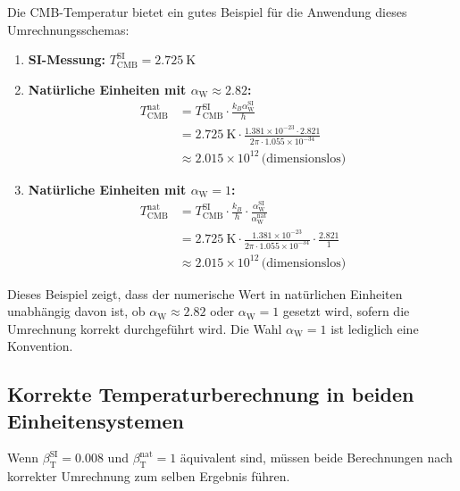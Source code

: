 \documentclass[12pt,a4paper]{article}
\newcommand{\betaT}{\beta_{\text{T}}}
\newcommand{\alphaW}{\alpha_{\text{W}}}
\begin{document}
	Die CMB-Temperatur bietet ein gutes Beispiel für die Anwendung dieses Umrechnungsschemas:
	
	\begin{enumerate}
		\item \textbf{SI-Messung:} \(T_{\text{CMB}}^{\text{SI}} = \SI{2.725}{\kelvin}\)
		\item \textbf{Natürliche Einheiten mit \(\alphaW \approx 2.82\):}
		\begin{align}
			T_{\text{CMB}}^{\text{nat}} &= T_{\text{CMB}}^{\text{SI}} \cdot \frac{k_B \alphaW^{\text{SI}}}{h} \\
			&= \SI{2.725}{\kelvin} \cdot \frac{1.381 \times 10^{-23} \cdot 2.821}{2\pi \cdot 1.055 \times 10^{-34}} \\
			&\approx 2.015 \times 10^{12} \, \text{(dimensionslos)}
		\end{align}
		\item \textbf{Natürliche Einheiten mit \(\alphaW = 1\):}
		\begin{align}
			T_{\text{CMB}}^{\text{nat}} &= T_{\text{CMB}}^{\text{SI}} \cdot \frac{k_B}{h} \cdot \frac{\alphaW^{\text{SI}}}{\alphaW^{\text{nat}}} \\
			&= \SI{2.725}{\kelvin} \cdot \frac{1.381 \times 10^{-23}}{2\pi \cdot 1.055 \times 10^{-34}} \cdot \frac{2.821}{1} \\
			&\approx 2.015 \times 10^{12} \, \text{(dimensionslos)}
		\end{align}
	\end{enumerate}
	
	Dieses Beispiel zeigt, dass der numerische Wert in natürlichen Einheiten unabhängig davon ist, ob \(\alphaW \approx 2.82\) oder \(\alphaW = 1\) gesetzt wird, sofern die Umrechnung korrekt durchgeführt wird. Die Wahl \(\alphaW = 1\) ist lediglich eine Konvention.
	
	\subsection{Korrekte Temperaturberechnung in beiden Einheitensystemen}
	
	Wenn \(\betaT^{\text{SI}} = 0.008\) und \(\betaT^{\text{nat}} = 1\) äquivalent sind, müssen beide Berechnungen nach korrekter Umrechnung zum selben Ergebnis führen.
	
\end{document}
